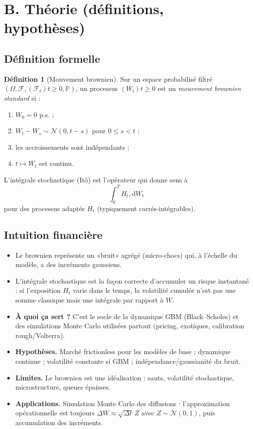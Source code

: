 \documentclass[11pt,a4paper]{report}
\theoremstyle{definition}
\newtheorem{definition}{Définition}[chapter]
\theoremstyle{plain}
\theoremstyle{remark}
\newcommand{\dd}{\mathrm{d}}
\newcommand{\1}{\mathbf{1}}
\newcommand{\Normal}{\mathcal{N}}
\newcommand{\Pmeas}{\mathbb{P}}
\newcommand{\F}{\mathcal{F}}
\newcommand{\qa}[4]{
\begin{itemize}[leftmargin=*]
\item \textbf{À quoi ça sert ?} #1
\item \textbf{Hypothèses.} #2
\item \textbf{Limites.} #3
\item \textbf{Applications.} #4
\end{itemize}
}
\begin{document}
\section{B. Théorie (définitions, hypothèses)}
\subsection*{Définition formelle}
\begin{definition}[Mouvement brownien]
Sur un espace probabilisé filtré $(\Omega,\F,(\F_t){t\ge 0},\Pmeas)$, un processus $(W_t){t\ge 0}$ est un \emph{mouvement brownien standard} si :
\begin{enumerate}[leftmargin=*]
\item $W_0=0$ p.s. ;
\item $W_t-W_s \sim \Normal(0,t-s)$ pour $0\le s<t$ ;
\item les accroissements sont indépendants ;
\item $t\mapsto W_t$ est continu.
\end{enumerate}
\end{definition}

L'intégrale stochastique (Itô) est l'opérateur qui donne sens à
\[
\int_0^T H_t,\dd W_t
\]
pour des processus adaptés $H_t$ (typiquement carrés-intégrables).

\subsection*{Intuition financière}
\begin{itemize}[leftmargin=*]
\item Le brownien représente un «bruit» agrégé (micro-chocs) qui, à l'échelle du modèle, a des incréments gaussiens.
\item L'intégrale stochastique est la façon correcte d'accumuler un risque instantané : si l'exposition $H_t$ varie dans le temps, la volatilité cumulée n'est pas une somme classique mais une intégrale par rapport à $W$.
\end{itemize}

\qa
{C'est le socle de la dynamique GBM (Black--Scholes) et des simulations Monte Carlo utilisées partout (pricing, exotiques, calibration rough/Volterra).}
{Marché frictionless pour les modèles de base ; dynamique continue ; volatilité constante si GBM ; indépendance/gaussianité du bruit.}
{Le brownien est une idéalisation : sauts, volatilité stochastique, microstructure, queues épaisses.}
{Simulation Monte Carlo des diffusions : l'approximation opérationnelle est toujours $\Delta W\approx \sqrt{\Delta t}\,Z$ avec $Z\sim\Normal(0,1)$, puis accumulation des incréments.}
\end{document}
